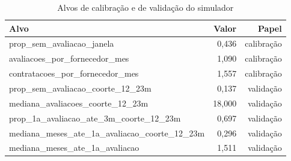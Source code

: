 \begin{table}[ht]
\centering
\caption{Alvos de calibração e de validação do simulador}
\label{tab:alvos}
\begin{tabular}{lrr}
\hline
\textbf{Alvo} & \textbf{Valor} & \textbf{Papel} \\
\hline
prop\_sem\_avaliacao\_janela & 0,436 & calibração \\
avaliacoes\_por\_fornecedor\_mes & 1,090 & calibração \\
contratacoes\_por\_fornecedor\_mes & 1,557 & calibração \\
prop\_sem\_avaliacao\_coorte\_12\_23m & 0,137 & validação \\
mediana\_avaliacoes\_coorte\_12\_23m & 18,000 & validação \\
prop\_1a\_avaliacao\_ate\_3m\_coorte\_12\_23m & 0,697 & validação \\
mediana\_meses\_ate\_1a\_avaliacao\_coorte\_12\_23m & 0,296 & validação \\
mediana\_meses\_ate\_1a\_avaliacao & 1,511 & validação \\
\hline
\end{tabular}
\end{table}
